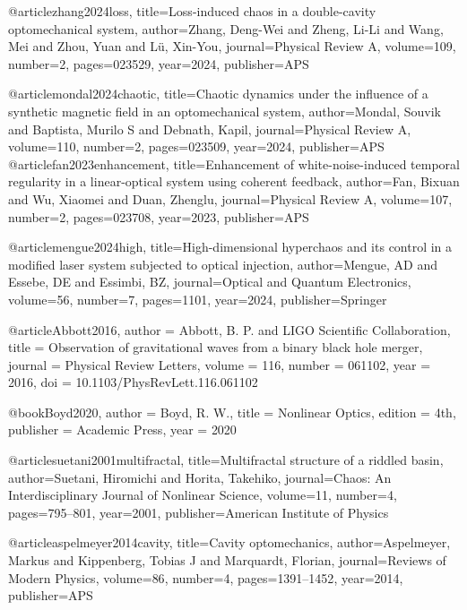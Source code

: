 @article{zhang2024loss,
  title={Loss-induced chaos in a double-cavity optomechanical system},
  author={Zhang, Deng-Wei and Zheng, Li-Li and Wang, Mei and Zhou, Yuan and L{\"u}, Xin-You},
  journal={Physical Review A},
  volume={109},
  number={2},
  pages={023529},
  year={2024},
  publisher={APS}
}

@article{mondal2024chaotic,
  title={Chaotic dynamics under the influence of a synthetic magnetic field in an optomechanical system},
  author={Mondal, Souvik and Baptista, Murilo S and Debnath, Kapil},
  journal={Physical Review A},
  volume={110},
  number={2},
  pages={023509},
  year={2024},
  publisher={APS}
}
@article{fan2023enhancement,
  title={Enhancement of white-noise-induced temporal regularity in a linear-optical system using coherent feedback},
  author={Fan, Bixuan and Wu, Xiaomei and Duan, Zhenglu},
  journal={Physical Review A},
  volume={107},
  number={2},
  pages={023708},
  year={2023},
  publisher={APS}
}





@article{mengue2024high,
  title={High-dimensional hyperchaos and its control in a modified laser system subjected to optical injection},
  author={Mengue, AD and Essebe, DE and Essimbi, BZ},
  journal={Optical and Quantum Electronics},
  volume={56},
  number={7},
  pages={1101},
  year={2024},
  publisher={Springer}
}








@article{Abbott2016,
  author = {Abbott, B. P. and {LIGO Scientific Collaboration}},
  title = {Observation of gravitational waves from a binary black hole merger},
  journal = {Physical Review Letters},
  volume = {116},
  number = {061102},
  year = {2016},
  doi = {10.1103/PhysRevLett.116.061102}
}

@book{Boyd2020,
  author = {Boyd, R. W.},
  title = {Nonlinear Optics},
  edition = {4th},
  publisher = {Academic Press},
  year = {2020}
}

@article{suetani2001multifractal,
  title={Multifractal structure of a riddled basin},
  author={Suetani, Hiromichi and Horita, Takehiko},
  journal={Chaos: An Interdisciplinary Journal of Nonlinear Science},
  volume={11},
  number={4},
  pages={795--801},
  year={2001},
  publisher={American Institute of Physics}
}

@article{aspelmeyer2014cavity,
  title={Cavity optomechanics},
  author={Aspelmeyer, Markus and Kippenberg, Tobias J and Marquardt, Florian},
  journal={Reviews of Modern Physics},
  volume={86},
  number={4},
  pages={1391--1452},
  year={2014},
  publisher={APS}
}

